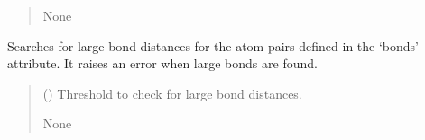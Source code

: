 \documentclass[letterpaper,10pt,english]{sphinxmanual}
\begin{document}
\begin{fulllineitems}
\begin{fulllineitems}
\begin{quote}
\begin{description}
\begin{itemize}
\end{itemize}

\sphinxAtStartPar
None

\end{description}\end{quote}

\end{fulllineitems}


\begin{fulllineitems}
\label{\detokenize{modules/system:hps.core.system.checkBondDistances}}
\pysigstartsignatures
{}
\pysigstopsignatures
\sphinxAtStartPar
Searches for large bond distances for the atom pairs defined in
the ‘bonds’ attribute. It raises an error when large bonds are found.
\begin{quote}\begin{description}
\sphinxAtStartPar
{} (\sphinxstyleliteralemphasis{\sphinxupquote{(}}\sphinxstyleliteralemphasis{\sphinxupquote{, }}\sphinxstyleliteralemphasis{\sphinxupquote{)}}) \textendash{} Threshold to check for large bond distances.

\sphinxAtStartPar
None

\end{description}\end{quote}

\end{fulllineitems}



\end{fulllineitems}
\end{document}
